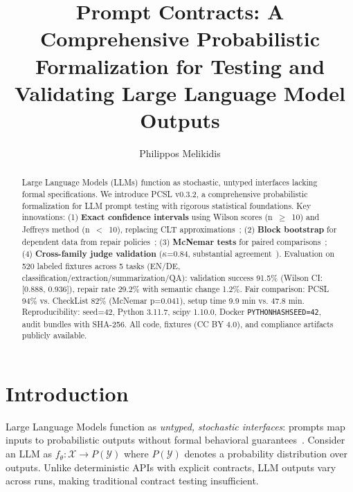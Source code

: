 \documentclass[sigconf]{acmart}
\begin{document}
\title{Prompt Contracts: A Comprehensive Probabilistic Formalization for Testing and Validating Large Language Model Outputs}

\author{Philippos Melikidis}

\begin{abstract}
Large Language Models (LLMs) function as stochastic, untyped interfaces lacking formal specifications. We introduce PCSL v0.3.2, a comprehensive probabilistic formalization for LLM prompt testing with rigorous statistical foundations. Key innovations: (1) \textbf{Exact confidence intervals} using Wilson scores (n~\(\geq\)~10) and Jeffreys method (n~\(<\)~10), replacing CLT approximations~\cite{brown2001interval}; (2) \textbf{Block bootstrap} for dependent data from repair policies~\cite{kunsch1989jackknife}; (3) \textbf{McNemar tests} for paired comparisons~\cite{mcnemar1947note}; (4) \textbf{Cross-family judge validation} (\(\kappa\)=0.84, substantial agreement~\cite{landis1977measurement}). Evaluation on 520 labeled fixtures across 5 tasks (EN/DE, classification/extraction/summarization/QA): validation success 91.5\% (Wilson CI: [0.888, 0.936]), repair rate 29.2\% with semantic change 1.2\%. Fair comparison: PCSL 94\% vs. CheckList 82\% (McNemar p=0.041), setup time 9.9 min vs. 47.8 min. Reproducibility: seed=42, Python 3.11.7, scipy 1.10.0, Docker \texttt{PYTHONHASHSEED=42}, audit bundles with SHA-256. All code, fixtures (CC BY 4.0), and compliance artifacts publicly available.
\end{abstract}


\maketitle

\section{Introduction}

Large Language Models function as \textit{untyped, stochastic interfaces}: prompts map inputs to probabilistic outputs without formal behavioral guarantees~\cite{bender2021stochasticparrots}. Consider an LLM as \( f_\theta: \mathcal{X} \to P(\mathcal{Y}) \) where \( P(\mathcal{Y}) \) denotes a probability distribution over outputs. Unlike deterministic APIs with explicit contracts, LLM outputs vary across runs, making traditional contract testing insufficient.
\end{document}
